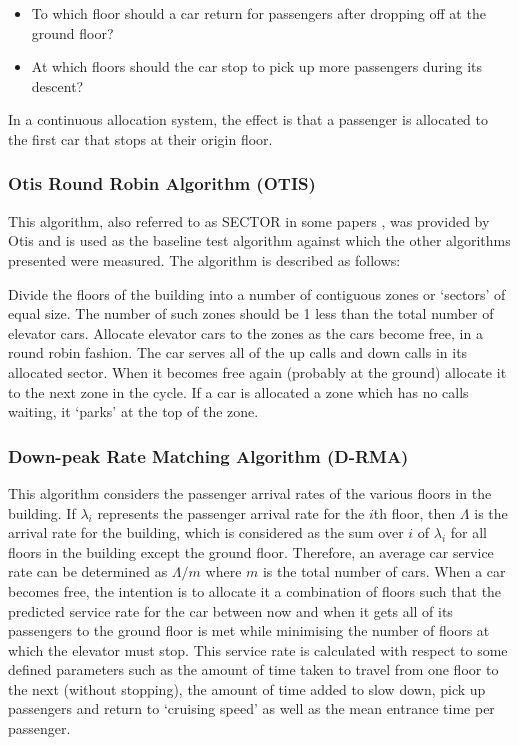 \documentclass{UoYCSproject}
\begin{document}
\begin{itemize}
	\item To which floor should a car return for passengers after dropping off at the ground floor?
	\item At which floors should the car stop to pick up more passengers during its descent?
\end{itemize}

In a continuous allocation system, the effect is that a passenger is allocated to the first car that stops at their origin floor.

\subsubsection{Otis Round Robin Algorithm (OTIS) \citep{Bao1994}}

This algorithm, also referred to as SECTOR in some papers \citep{Crites1996, Crites1998}, was provided by Otis and is used as the baseline test algorithm against which the other algorithms presented were measured.  The algorithm is described as follows:

Divide the floors of the building into a number of contiguous zones or `sectors' of equal size.  The number of such zones should be 1 less than the total number of elevator cars.  Allocate elevator cars to the zones as the cars become free, in a round robin fashion.  The car serves all of the up calls and down calls in its allocated sector.  When it becomes free again (probably at the ground) allocate it to the next zone in the cycle.  If a car is allocated a zone which has no calls waiting, it `parks' at the top of the zone.

\subsubsection{Down-peak Rate Matching Algorithm (D-RMA) \citep{Bao1994}}

This algorithm considers the passenger arrival rates of the various floors in the building.  If $\lambda_i$ represents the passenger arrival rate for the $i$th floor, then $\Lambda$ is the arrival rate for the building, which is considered as the sum over $i$ of $\lambda_i$ for all floors in the building except the ground floor.  Therefore, an average car service rate can be determined as $\Lambda / m$ where $m$ is the total number of cars.  When a car becomes free, the intention is to allocate it a combination of floors such that the predicted service rate for the car between now and when it gets all of its passengers to the ground floor is met while minimising the number of floors at which the elevator must stop.  This service rate is calculated with respect to some defined parameters such as the amount of time taken to travel from one floor to the next (without stopping), the amount of time added to slow down, pick up passengers and return to `cruising speed' as well as the mean entrance time per passenger.
\end{document}
